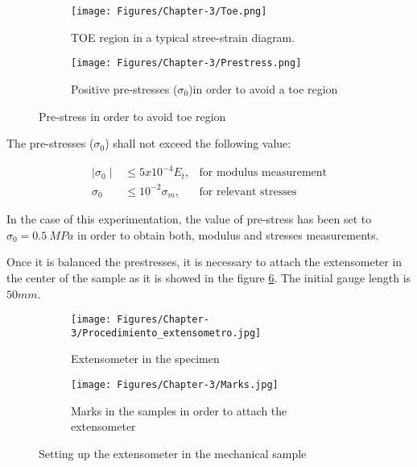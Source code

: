 \begin{enumerate}[leftmargin=0in, label=\emph{\alph*}.]
\begin{figure}[H]
	\centering
	\begin{subfigure}[t]{0.45\textwidth}
		\texttt{[image: Figures/Chapter-3/Toe.png]}
		\caption{TOE region in a typical stree-strain diagram.}
		\label{sample.toe}
	\end{subfigure}
	\qquad
	\begin{subfigure}[t]{0.45\textwidth}
		\texttt{[image: Figures/Chapter-3/Prestress.png]}
		\caption{Positive pre-stresses ($\sigma_{0}$)in order to avoid a toe region}
		\label{prestress}
	\end{subfigure}
	\caption{Pre-stress in order to avoid toe region}
	\label{toe}
\end{figure}


The pre-stresses ($\sigma_{0}$)  shall not exceed the following value:

\begin{align}
\mid\sigma_{0}\mid & \leqslant 5x10^{-4}E_{t}, &\text{for modulus measurement}\\
\sigma_{0} &\leqslant 10^{-2}\sigma_{m}, &\text{for relevant stresses} 
\end{align}

In the case of this experimentation, the value of pre-stress has been set to $\sigma_{0}=0.5~MPa$ in order to obtain both, modulus and stresses measurements.



Once it is balanced the prestresses, it is necessary to attach the extensometer in the center of the sample as it is showed in the figure \ref{setting.extensometer}. The initial gauge length is $50mm$.

\begin{figure} [H]
	\centering
	\begin{subfigure}[t]{0.35\textwidth}
		\texttt{[image: Figures/Chapter-3/Procedimiento\_extensometro.jpg]}
		\caption{Extensometer in the specimen}
		\label{procedure.extensometer}
	\end{subfigure}
	\qquad
	\begin{subfigure}[t]{0.4\textwidth}
		\texttt{[image: Figures/Chapter-3/Marks.jpg]}
		\label{marks}
		\caption{Marks in the samples in order to attach the extensometer}
	\end{subfigure}
	\caption{Setting up the extensometer in the mechanical sample}
	\label{setting.extensometer}
\end{figure}


\end{enumerate}
